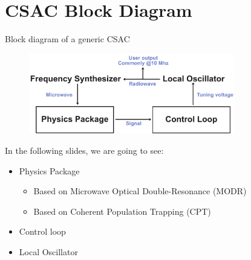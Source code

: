\section{CSAC Block Diagram}

\begin{frame}{Block diagram of a generic CSAC}

    \begin{figure}
        \centering
        \includegraphics[width=0.8\textwidth]{pdf/CSAC-block-diagram.pdf}
    \end{figure}

    In the following slides, we are going to see:

    \begin{itemize}
        \item Physics Package
              \begin{itemize}
                  \item Based on Microwave Optical Double-Resonance (MODR)
                  \item Based on Coherent Population Trapping (CPT)
              \end{itemize}
        \item Control loop
        \item Local Oscillator
    \end{itemize}

\end{frame}